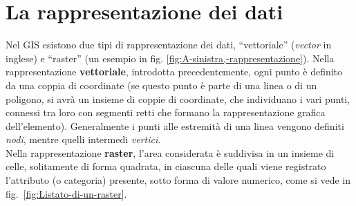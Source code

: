 \section{La rappresentazione dei dati}
	Nel GIS esistono due tipi di rappresentazione dei dati, ``vettoriale'' (\emph{vector} in inglese) e ``raster'' (un esempio in fig. \ref{fig:A-sinistra,-rappresentazione}). Nella rappresentazione \textbf{vettoriale}, introdotta precedentemente, ogni punto è definito da una coppia di coordinate (se questo punto è parte di una linea o di un poligono, si avrà un insieme di coppie di coordinate, che individuano i vari punti, connessi tra loro con segmenti retti che formano la rappresentazione grafica dell'elemento). Generalmente i punti alle estremità di una linea vengono definiti \emph{nodi}, mentre quelli intermedi \emph{vertici}.\\ Nella rappresentazione \textbf{raster}, l'area considerata è suddivisa in un insieme di celle, solitamente di forma quadrata, in ciascuna delle quali viene registrato l'attributo (o categoria) presente, sotto forma di valore numerico, come si vede in fig.~\ref{fig:Listato-di-un-raster}.\\
	
